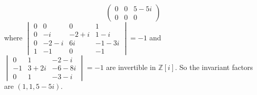 \documentclass[a4paper, 12pt]{article}
\begin{document}
\begin{solution}
\begin{enumerate}[(a)]
\[\begin{pmatrix}
	0&0&5-5i\\ 
	0&0&0
\end{pmatrix}\]
where \(\begin{vmatrix}
	0&0&0&1\\ 
	0&-i&-2+i&1-i\\ 
	0&-2-i&6i&-1-3i\\ 
	1&-1&0&-1
\end{vmatrix}=-1\) and \(\begin{vmatrix}
	0&1&-2-i\\ 
	-1&3+2i&-6-8i\\ 
	0&1&-3-i
\end{vmatrix}=-1\) are invertible in \(\mathbb{Z}[i]\). So the invariant factors are \((1,1,5-5i)\).
\end{enumerate} 
\end{solution}
\end{document}

